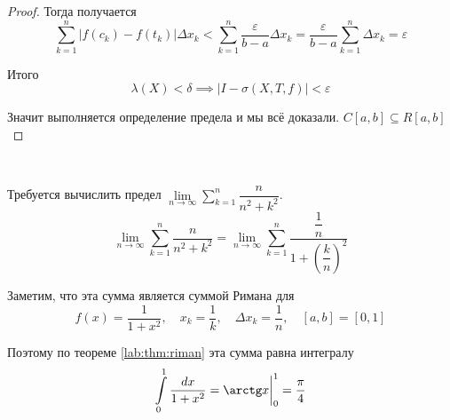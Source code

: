 \documentclass[../main.tex]{subfiles}
\begin{document}
\begin{proof}
    Тогда получается 
    \[ \sum\limits_{ k=1}^{ n} \left| f\left( c_k\right)-f\left( t_k\right)\right| \Delta x_k < \sum\limits_{ k=1}^{ n} \dfrac{ \varepsilon}{ b-a} \Delta x_k= \dfrac{ \varepsilon}{ b-a} \sum\limits_{ k=1}^{ n} \Delta x_k= \varepsilon \]

    Итого 
    \[ \lambda \left( X\right) < \delta \implies \left| I-\sigma\left( X,T,f\right)\right| < \varepsilon \]

    Значит выполняется определение предела и мы всё доказали. \( C\left[ a,b\right] \subseteq R \left[ a,b\right]\)
\end{proof}

\begin{example}
    
    ~

    Требуется вычислить предел \( \lim\limits_{ n\rightarrow \infty } \sum\limits_{ k=1}^{ n} \dfrac{ n}{ n^2+k^2}\). 
    \[ \lim\limits_{ n\rightarrow \infty } \sum\limits_{ k=1}^{ n} \dfrac{ n}{ n^2+k^2}=\lim\limits_{ n\rightarrow \infty } \sum\limits_{ k=1}^{ n} \dfrac{ \dfrac{ 1}{ n} }{ 1+ \left(\dfrac{ k}{ n} \right)^2}\]

    Заметим, что эта сумма является суммой Римана для 
    \[ f\left( x\right)= \dfrac{ 1}{ 1+x^2} ,\quad x_k= \dfrac{ 1}{ k} ,\quad \Delta x_k= \dfrac{ 1}{ n} ,\quad \left[ a,b\right]=\left[ 0,1\right]\] 
    
    Поэтому по теореме \ref{lab:thm:riman} эта сумма равна интегралу 
    \[ \displaystyle\int\limits_{ 0}^{ 1} \dfrac{ dx}{ 1+x^2} = \arctg x \bigg|_0^1 = \dfrac{ \pi}{ 4} \]
\end{example}
\end{document}
